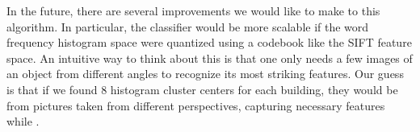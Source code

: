 In the future, there are several improvements we would like to make to this
algorithm. In particular, the classifier would be more scalable if the word
frequency histogram space were quantized using a codebook like the SIFT feature
space. An intuitive way to think about this is that one only needs a few images
of an object from different angles to recognize its most striking features.
Our guess is that if we found 8 histogram cluster centers for each building,
they would be from pictures taken from different perspectives, capturing
necessary features while .



